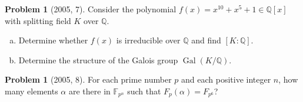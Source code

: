 \documentclass{article}
\newcommand{\inv}{^{-1}}
\newcommand{\<}{\langle} %
\renewcommand{\>}{\rangle} %
\DeclareMathOperator{\Gal}{Gal}
\DeclareMathOperator{\Aut}{Aut}
\theoremstyle{plain}
\theoremstyle{remark}
\theoremstyle{definition}
\newtheorem{examproblem}[equation]{Problem}
\begin{document}
\begin{examproblem}[2005, 7]
	Consider the polynomial $f(x)=x^{10}+x^5+1\in\mathbb Q[x]$ with
	splitting field $K$ over $\mathbb Q$.
	\begin{enumerate}[(a)]
		\item Determine whether $f(x)$ is irreducible over $\mathbb Q$ and find
			$[K:\mathbb Q]$.
		\item Determine the structure of the Galois group
			$\Gal(K/\mathbb Q)$.
	\end{enumerate}
\end{examproblem}

\begin{examproblem}[2005, 8]
	For each prime number $p$ and each positive integer $n$, how many
	elements $\alpha$ are there in $\mathbb F_{p^n}$ such that
	$F_p(\alpha)=F_{p^6}$?
\end{examproblem}

\begin{comment}

  \section{Other Problems}
The exercises in Dummit and Foote section 4.4, 4.5, and 5.5 seem to cover
everything that could come up related to classifying groups of a given order.
 particular, most of the exercises in 5.5 seem quite important. Also, exercises
12-41 in Lang.

\begin{examproblem}[Dummit and Foote 5.5.6.]
	Assume that $K$ is a cyclic group, $H$ is an arbitrary group, and $\varphi_1$
	and $\varphi_2$ are homomorphisms from $K$ into $\Aut(H)$ such that
	$\varphi_1(K)$ and $\varphi_2(K)$ are conjugate subgroups
	of $\Aut(H)$. Prove by constructing an explicit isomorphism that
	$H\rtimes_{\varphi_1}K\cong H\rtimes_{\varphi_2} K$.
	[Suppose $\sigma_{\varphi_1}(K)\sigma\inv=\varphi_2(K)$
	so that for some $a\in\mathbb Z$ we have $\sigma\varphi_1(k)\sigma\inv
	=\varphi_2(k)^a$ for all $k\in K$. Show that the map $\psi:H
	\rtimes_{\varphi_1}K\rightarrow H\rtimes_{\varphi_2}K$
	defined by $\psi((h,k))=(\sigma(h),k^a)$ is a homomorphism.
	Show $\psi$ is bijective by construcing a 2-sided inverse.]
\end{examproblem}
\end{comment}
\end{document}
